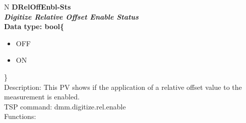 \documentclass[openany]{article}
\begin{document}
		\begin{tabular}{N}
			\hline
			\bfseries DRelOffEnbl-Sts\label{pv:dreloffenbl-sts} \\ \hline
			\emph{Digitize Relative Offset Enable Status} \\
			Data type: bool\{\begin{itemize}[noitemsep]
				\small
				\item[] OFF
				\item[] ON
			\end{itemize}\} \\
			Description: This PV shows if the application of a relative offset value to the measurement is enabled. \\
			TSP command: dmm.digitize.rel.enable \\
			Functions: \\
			\arrayrulecolor{\FuncTableBorderColor}

		\end{tabular}
\end{document}
